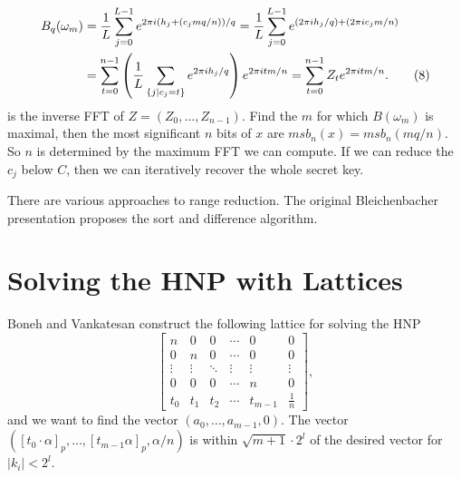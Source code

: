 \begin{align}
    B_q(\omega_m) 
    &= \frac{1}{L} \sum_{j=0}^{L-1} e^{2\pi i (h_j + (c_j m q / n))/q} 
    = \frac{1}{L} \sum_{j=0}^{L-1} e^{(2\pi i h_j / q) + (2\pi i c_j m / n)} \notag \\
    &= \sum_{t=0}^{n-1} \left( \frac{1}{L} \sum_{\substack{\{j \mid c_j = t\}}} e^{2\pi i h_j / q} \right) e^{2\pi i t m / n} 
    = \sum_{t=0}^{n-1} Z_t e^{2\pi i t m / n}. \tag{8}
\end{align}
is the inverse FFT of $Z = (Z_0, \ldots, Z_{n-1})$. Find the $m$ for which $B(\omega_m)$ is maximal, then the most significant $n$ bits of $x$ are $msb_n(x) = msb_n(mq/n)$. So $n$ is determined by the maximum FFT we can compute. If we can reduce the $c_j$ below $C$, then we can iteratively recover the whole secret key.


There are various approaches to range reduction. The original Bleichenbacher presentation proposes the sort and difference algorithm.

\begin{definition}
    
\end{definition}


\section{Solving the HNP with Lattices}
Boneh and Vankatesan construct the following lattice for solving the HNP
\begin{equation}
    \begin{bmatrix}
    n & 0 & 0 & \cdots & 0 & 0 \\
    0 & n & 0 & \cdots & 0 & 0 \\
    \vdots & \vdots & \ddots & \vdots & \vdots & \vdots \\
    0 & 0 & 0 & \cdots & n & 0 \\
    t_0 & t_1 & t_2 & \cdots & t_{m-1} & \frac{1}{n}
    \end{bmatrix},
\end{equation}
and we want to find the vector $(a_0, \ldots, a_{m-1}, 0)$. The vector $([t_0 \cdot \alpha]_p, \dots, [t_{m-1}\alpha]_p, \alpha/n)$ is within $\sqrt{m+1}\cdot 2^l$ of the desired vector for $|k_i| < 2^l$.
